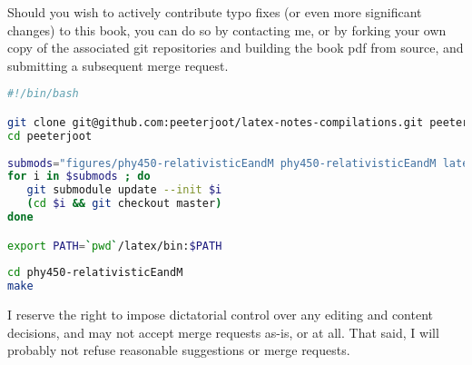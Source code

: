 %
%

Should you wish to actively contribute typo fixes (or even more significant changes) to this book, you can do so by contacting me, or by forking your own copy of the associated git repositories and building the book pdf from source, and submitting a subsequent merge request.

\begin{lstlisting}[language=bash]
#!/bin/bash

git clone git@github.com:peeterjoot/latex-notes-compilations.git peeterjoot
cd peeterjoot
 
submods="figures/phy450-relativisticEandM phy450-relativisticEandM latex"
for i in $submods ; do
   git submodule update --init $i
   (cd $i && git checkout master)
done

export PATH=`pwd`/latex/bin:$PATH
 
cd phy450-relativisticEandM
make
\end{lstlisting}

I reserve the right to impose dictatorial control over any editing and content decisions, and may not accept merge requests as-is, or at all. That said, I will probably not refuse reasonable suggestions or merge requests.
